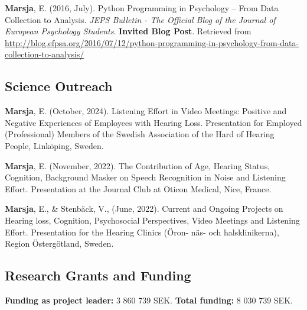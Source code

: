 \documentclass[]{article}
\begin{document}
\textbf{Marsja}, E. (2016, July). Python Programming in Psychology --
From Data Collection to Analysis. \emph{JEPS Bulletin - The Official
Blog of the Journal of European Psychology Students}. \textbf{Invited
Blog Post}. Retrieved from
\sloppy \url{http://blog.efpsa.org/2016/07/12/python-programming-in-psychology-from-data-collection-to-analysis/}

\subsection{Science Outreach}\label{science-outreach}

\textbf{Marsja}, E. (October, 2024). Listening Effort in Video Meetings:
Positive and Negative Experiences of Employees with Hearing Loss.
Presentation for Employed (Professional) Members of the Swedish
Association of the Hard of Hearing People, Linköping, Sweden.

\textbf{Marsja}, E. (November, 2022). The Contribution of Age, Hearing
Status, Cognition, Background Masker on Speech Recognition in Noise and
Listening Effort. Presentation at the Journal Club at Oticon Medical,
Nice, France.

\textbf{Marsja}, E., \& Stenbäck, V., (June, 2022). Current and Ongoing
Projects on Hearing loss, Cognition, Psychosocial Perspectives, Video
Meetings and Listening Effort. Presentation for the Hearing Clinics
(Öron- näs- och halsklinikerna), Region Östergötland, Sweden.

\subsection{Research Grants and
Funding}\label{research-grants-and-funding}

\textbf{Funding as project leader:} 3 860 739 SEK. \textbf{Total
funding:} 8 030 739 SEK.
\end{document}
